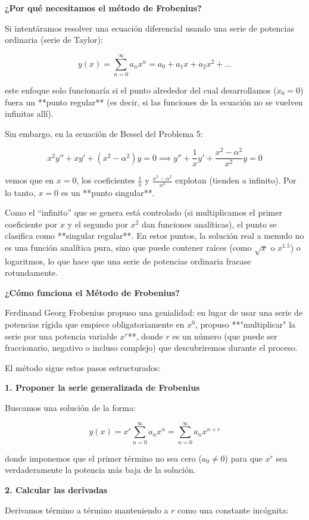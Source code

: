 \documentclass[11pt,spanish]{article}
\begin{document}
{\bf ¿Por qué necesitamos el método de Frobenius?}

Si intentáramos resolver una ecuación diferencial usando una serie de potencias ordinaria (serie de Taylor):


$$y(x) = \sum_{n=0}^{\infty} a_n x^n = a_0 + a_1 x + a_2 x^2 + \dots$$


este enfoque solo funcionaría si el punto alrededor del cual desarrollamos ($x_0 = 0$) fuera un **punto regular** (es decir, si las funciones de la ecuación no se vuelven infinitas allí).

Sin embargo, en la ecuación de Bessel del Problema 5:


$$x^2 y'' + x y' + (x^2 - \alpha^2)y = 0 \implies y'' + \frac{1}{x} y' + \frac{x^2 - \alpha^2}{x^2} y = 0$$


vemos que en $x = 0$, los coeficientes $\frac{1}{x}$ y $\frac{x^2-\alpha^2}{x^2}$ explotan (tienden a infinito). Por lo tanto, $x=0$ es un **punto singular**.

Como el ``infinito'' que se genera está controlado (si multiplicamos el primer coeficiente por $x$ y el segundo por $x^2$ dan funciones analíticas), el punto se clasifica como **singular regular**. En estos puntos, la solución real a menudo no es una función analítica pura, sino que puede contener raíces (como $\sqrt{x}$ o $x^{1.5}$) o logaritmos, lo que hace que una serie de potencias ordinaria fracase rotundamente.

{\bf ¿Cómo funciona el Método de Frobenius?}

Ferdinand Georg Frobenius propuso una genialidad: en lugar de usar una serie de potencias rígida que empiece obligatoriamente en $x^0$, propuso **"multiplicar" la serie por una potencia variable $x^r$**, donde $r$ es un número (que puede ser fraccionario, negativo o incluso complejo) que descubriremos durante el proceso.

El método sigue estos pasos estructurados:

{\bf 1. Proponer la serie generalizada de Frobenius}

Buscamos una solución de la forma:


$$y(x) = x^r \sum_{n=0}^{\infty} a_n x^n = \sum_{n=0}^{\infty} a_n x^{n+r}$$


donde imponemos que el primer término no sea cero ($a_0 \neq 0$) para que $x^r$ sea verdaderamente la potencia más baja de la solución.

{\bf 2. Calcular las derivadas}

Derivamos término a término manteniendo a $r$ como una constante incógnita:
\end{document}
